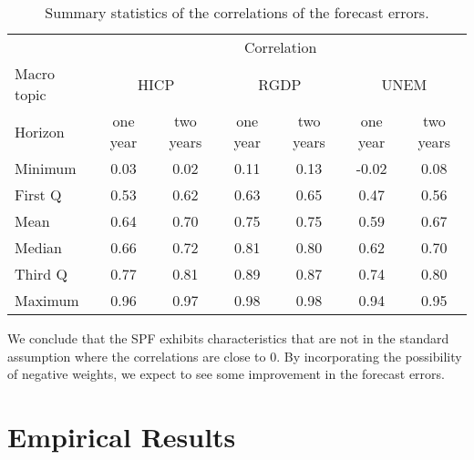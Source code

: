 \documentclass[11pt]{article}
\begin{document}
	\begin{table}[!h]
		\centering
		\caption{Summary statistics of the correlations of the forecast errors.}
		\label{tab: correlation summary statistics}
		\begin{tabular}{lcccccc}%
			\hline
			&\multicolumn{6}{c}{Correlation}\\
			\cmidrule(lr){2-7}
			Macro topic & \multicolumn{2}{c}{HICP} & \multicolumn{2}{c}{RGDP} & \multicolumn{2}{c}{UNEM} \\
			\cmidrule(lr){2-3} \cmidrule(lr){4-5}\cmidrule(lr){6-7}
			Horizon     & one year & two years & one year & two years & one year & two years \\ 
			\hline
			Minimum     & 0.03        & 0.02        & 0.11        & 0.13        & -0.02        & 0.08       \\
			First Q     & 0.53        & 0.62        & 0.63        & 0.65        & 0.47         & 0.56       \\
			Mean        & 0.64        & 0.70        & 0.75        & 0.75        & 0.59         & 0.67       \\
			Median      & 0.66        & 0.72        & 0.81        & 0.80        & 0.62         & 0.70       \\
			Third Q     & 0.77        & 0.81        & 0.89        & 0.87        & 0.74         & 0.80       \\
			Maximum     & 0.96        & 0.97        & 0.98        & 0.98        & 0.94         & 0.95       \\ 
			\hline
		\end{tabular}
	\end{table}
	
	
	We conclude that the SPF exhibits characteristics that are not in the standard assumption where the correlations are close to 0. By incorporating the possibility of negative weights, we expect to see some improvement in the forecast errors.
	
	\section{Empirical Results}\label{empirical-results}
\end{document}
